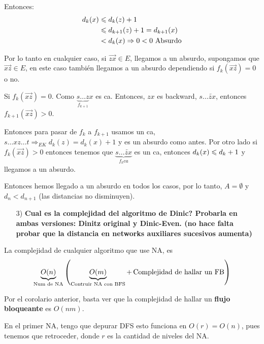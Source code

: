 \documentclass[12pt,a4paper]{article}
\begin{document}
Entonces: 
\begin{align*}
    d_{k}(x) &\leqslant d_{k}(z)+1\\
    & \leqslant d_{k+1}(z) +1 = d_{k+1}(x)\\
    & < d_{k}(x) \Rightarrow 0 < 0 \,\,\text{Absurdo}
\end{align*}

Por lo tanto en cualquier caso, si $\overrightarrow{zx} \in E$, llegamos a un absurdo, 
supongamos que $\overrightarrow{xz} \in E$, en este caso también llegamos a un absurdo 
dependiendo si $f_{k}(\overrightarrow{xz}) = 0$ o no.
\medskip

Si $f_{k}(\overrightarrow{xz}) = 0$. Como $\underbrace{s\ldots z}_{f_{k+1}}x$ es ca. 
Entonces, $zx$ es backward, $s\ldots \overleftarrow{zx}$, entonces $f_{k+1}(\overrightarrow{xz}) > 0$.
\medskip

Entonces para pasar de $f_{k}$ a $f_{k+1}$ usamos un ca, $s\ldots xz \ldots t\Rightarrow_{EK} d_{k}(z) = d_{k}(x)+1$ 
y es un absurdo como antes. Por otro lado si $f_{k}(\overrightarrow{xz}) > 0$ entonces 
tenemos que $\underbrace{s\ldots \overleftarrow{zx}}_{f_{k} ca}$ es un ca, entonces 
$d_{k}(x)\leqslant d_{k}+1$ y llegamos a un absurdo.
\medskip

Entonces hemos llegado a un absurdo en todos los casos, por lo tanto, $A = \emptyset$ 
y $d_{n} < d_{n+1}$ (las distancias no disminuyen).

\begin{itemize}
    \item [3)] \textbf{Cual es la complejidad del algoritmo de Dinic? Probarla en ambas 
    versiones: Dinitz original y Dinic-Even. (no hace falta probar que la distancia 
    en networks auxiliares sucesivos aumenta)}
    \label{dem:Dinic}
\end{itemize}

\begin{corolario} La complejidad de cualquier algoritmo que use NA, es 
    $$\underbrace{O(n)}_{\text{Num de NA}}\left(\underbrace{O(m)}_{\text{Contruir NA con BFS}} + \,\text{Complejidad de hallar un FB}\right)$$
    \label{cor:NA}
\end{corolario}

Por el corolario anterior, basta ver que la complejidad de hallar un \textbf{flujo bloqueante} 
es $O(nm)$.
\medskip

En el primer NA, tengo que depurar DFS esto funciona en $O(r) = O(n)$, pues tenemos 
que retroceder, donde $r$ es la cantidad de niveles del NA.
\medskip
\end{document}
